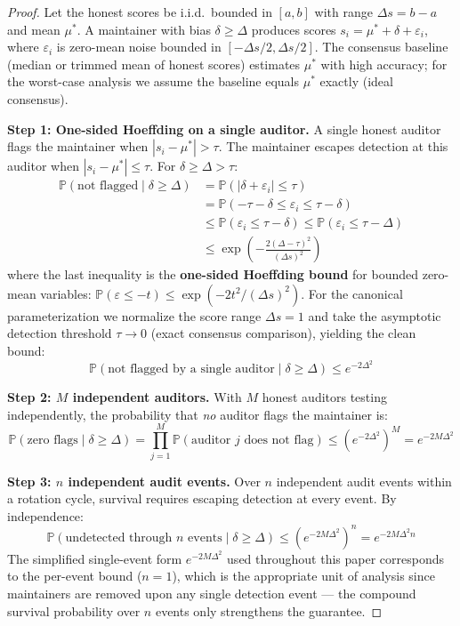 \documentclass[12pt,a4paper]{article}
\theoremstyle{remark}
\newcommand{\Pbb}{\mathbb{P}}
\begin{document}
\begin{proof}
Let the honest scores be i.i.d.\ bounded in $[a, b]$ with range $\Delta s = b - a$
and mean $\mu^*$. A maintainer with bias $\delta \geq \Delta$ produces scores
$s_i = \mu^* + \delta + \varepsilon_i$, where $\varepsilon_i$ is zero-mean noise
bounded in $[-\Delta s/2, \Delta s/2]$. The consensus baseline (median or trimmed
mean of honest scores) estimates $\mu^*$ with high accuracy; for the worst-case
analysis we assume the baseline equals $\mu^*$ exactly (ideal consensus).

\textbf{Step 1: One-sided Hoeffding on a single auditor.}
A single honest auditor flags the maintainer when $|s_i - \mu^*| > \tau$.
The maintainer escapes detection at this auditor when $|s_i - \mu^*| \leq \tau$.
For $\delta \geq \Delta > \tau$:
\begin{equation}
\begin{aligned}
\Pbb(\text{not flagged} \mid \delta \geq \Delta)
&= \Pbb(|\delta + \varepsilon_i| \leq \tau) \\
&= \Pbb(-\tau - \delta \leq \varepsilon_i \leq \tau - \delta) \\
&\leq \Pbb(\varepsilon_i \leq \tau - \delta)
\leq \Pbb(\varepsilon_i \leq \tau - \Delta) \\
&\leq \exp\!\left(-\frac{2(\Delta - \tau)^2}{(\Delta s)^2}\right)
\end{aligned}
\end{equation}
where the last inequality is the \textbf{one-sided Hoeffding bound} for bounded
zero-mean variables: $\Pbb(\varepsilon \leq -t) \leq \exp(-2t^2/(\Delta s)^2)$.
For the canonical parameterization we normalize the score range $\Delta s = 1$ and
take the asymptotic detection threshold $\tau \to 0$ (exact consensus comparison),
yielding the clean bound:
\begin{equation}
\boxed{\Pbb(\text{not flagged by a single auditor} \mid \delta \geq \Delta) \leq e^{-2\Delta^2}}
\end{equation}

\textbf{Step 2: $M$ independent auditors.}
With $M$ honest auditors testing independently, the probability that
\textit{no} auditor flags the maintainer is:
\begin{equation}
\Pbb(\text{zero flags} \mid \delta \geq \Delta)
= \prod_{j=1}^{M} \Pbb(\text{auditor } j \text{ does not flag})
\leq \left(e^{-2\Delta^2}\right)^{\!M} = e^{-2M\Delta^2}
\end{equation}

\textbf{Step 3: $n$ independent audit events.}
Over $n$ independent audit events within a rotation cycle, survival requires
escaping detection at every event. By independence:
\begin{equation}
\Pbb(\text{undetected through } n \text{ events} \mid \delta \geq \Delta)
\leq \left(e^{-2M\Delta^2}\right)^{\!n} = e^{-2M\Delta^2 n}
\end{equation}
The simplified single-event form $e^{-2M\Delta^2}$ used throughout this paper
corresponds to the per-event bound ($n = 1$), which is the appropriate unit of
analysis since maintainers are removed upon any single detection event — the
compound survival probability over $n$ events only strengthens the guarantee.
\end{proof}
\end{document}
